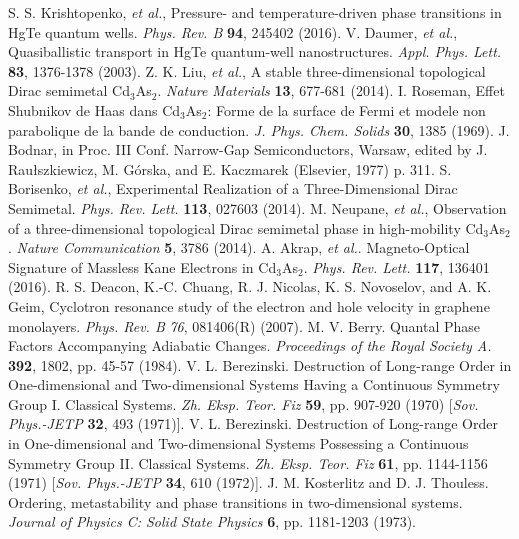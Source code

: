 \documentclass[titlepage,a4paper]{book}
\begin{document}
\begin{thebibliography}{99}
S. S. Krishtopenko, \textit{et al.}, Pressure- and temperature-driven phase transitions in HgTe quantum wells. \textit{Phys. Rev. B} \textbf{94}, 245402 (2016).
V. Daumer, \textit{et al.}, Quasiballistic transport in HgTe quantum-well nanostructures. \textit{Appl. Phys. Lett.} \textbf{83}, 1376-1378 (2003).
Z. K. Liu, \textit{et al.}, A stable three-dimensional topological Dirac semimetal Cd$_3$As$_2$. \textit{Nature Materials} \textbf{13}, 677-681 (2014).  
I. Roseman, Effet Shubnikov de Haas dans Cd$_3$As$_2$: Forme de la surface de Fermi et modele non parabolique de la bande de conduction. \textit{J. Phys. Chem. Solids} \textbf{30}, 1385 (1969).
J. Bodnar, in Proc. III Conf. Narrow-Gap Semiconductors, Warsaw, edited by J. Raułszkiewicz, M. Górska, and E. Kaczmarek (Elsevier, 1977) p. 311.
S. Borisenko, \textit{et al.}, Experimental Realization of a Three-Dimensional Dirac Semimetal. \textit{Phys. Rev. Lett.} \textbf{113}, 027603 (2014).
M. Neupane, \textit{et al.}, Observation of a three-dimensional topological Dirac semimetal phase in high-mobility Cd$_3$As$_2$. \textit{Nature Communication} \textbf{5}, 3786 (2014).
A. Akrap, \textit{et al.}. Magneto-Optical Signature of Massless Kane Electrons in Cd$_3$As$_2$. \textit{Phys. Rev. Lett.} \textbf{117}, 136401 (2016). 
R. S. Deacon, K.-C. Chuang, R. J. Nicolas, K. S. Novoselov, and A. K. Geim, Cyclotron resonance study of the electron and hole velocity in graphene monolayers. \textit{Phys. Rev. B} \textit{76}, 081406(R) (2007).
M. V. Berry. Quantal Phase Factors Accompanying Adiabatic Changes. \textit{Proceedings of the Royal Society A.} \textbf{392}, 1802, pp. 45-57 (1984).
V. L. Berezinski. Destruction of Long-range Order in One-dimensional and Two-dimensional Systems Having a Continuous Symmetry Group I. Classical Systems. \textit{Zh. Eksp. Teor. Fiz} \textbf{59}, pp. 907-920 (1970) [\textit{Sov. Phys.-JETP} \textbf{32}, 493 (1971)].
V. L. Berezinski. Destruction of Long-range Order in One-dimensional and Two-dimensional Systems Possessing a Continuous Symmetry Group II. Classical Systems. \textit{Zh. Eksp. Teor. Fiz} \textbf{61}, pp. 1144-1156 (1971) [\textit{Sov. Phys.-JETP} \textbf{34}, 610 (1972)].
J. M. Kosterlitz and D. J. Thouless. Ordering, metastability and phase transitions in two-dimensional systems. \textit{Journal of Physics C: Solid State Physics} \textbf{6}, pp. 1181-1203 (1973).

\end{thebibliography}
\end{document}
